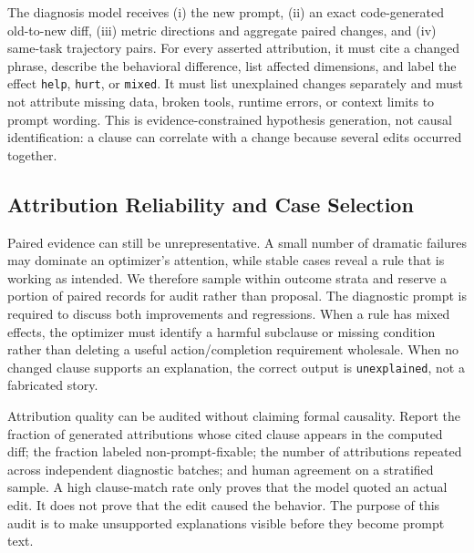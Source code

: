 \documentclass[10pt]{article}
\begin{document}
The diagnosis model receives (i) the new prompt, (ii) an exact code-generated old-to-new diff, (iii) metric directions and aggregate paired changes, and (iv) same-task trajectory pairs. For every asserted attribution, it must cite a changed phrase, describe the behavioral difference, list affected dimensions, and label the effect \texttt{help}, \texttt{hurt}, or \texttt{mixed}. It must list unexplained changes separately and must not attribute missing data, broken tools, runtime errors, or context limits to prompt wording. This is evidence-constrained hypothesis generation, not causal identification: a clause can correlate with a change because several edits occurred together.

\subsection{Attribution Reliability and Case Selection}
Paired evidence can still be unrepresentative. A small number of dramatic failures may dominate an optimizer's attention, while stable cases reveal a rule that is working as intended. We therefore sample within outcome strata and reserve a portion of paired records for audit rather than proposal. The diagnostic prompt is required to discuss both improvements and regressions. When a rule has mixed effects, the optimizer must identify a harmful subclause or missing condition rather than deleting a useful action/completion requirement wholesale. When no changed clause supports an explanation, the correct output is \texttt{unexplained}, not a fabricated story.

Attribution quality can be audited without claiming formal causality. Report the fraction of generated attributions whose cited clause appears in the computed diff; the fraction labeled non-prompt-fixable; the number of attributions repeated across independent diagnostic batches; and human agreement on a stratified sample. A high clause-match rate only proves that the model quoted an actual edit. It does not prove that the edit caused the behavior. The purpose of this audit is to make unsupported explanations visible before they become prompt text.
\end{document}
